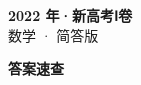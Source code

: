 \documentclass[zihao=-4, a4paper]{ctexart}
\begin{document}
\begin{center}
  {\Large\bfseries 2022 年·新高考Ⅰ卷}\\[4pt]
  {\large 数学 · 简答版}
\end{center}
\medskip
{}

\clearpage
{}
\begin{center}{\Large\bfseries 答案速查}\end{center}
\medskip

\end{document}
